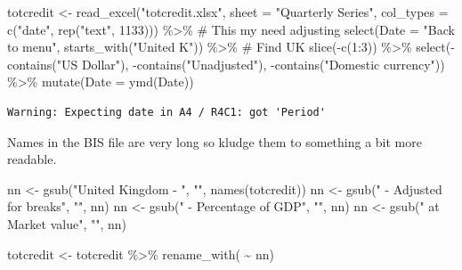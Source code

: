 \documentclass[
  letterpaper,
]{book}
\newenvironment{Shaded}{\begin{snugshade}}{\end{snugshade}}
\newcommand{\AttributeTok}[1]{\textcolor[rgb]{0.40,0.45,0.13}{#1}}
\newcommand{\CommentTok}[1]{\textcolor[rgb]{0.37,0.37,0.37}{#1}}
\newcommand{\DecValTok}[1]{\textcolor[rgb]{0.68,0.00,0.00}{#1}}
\newcommand{\FunctionTok}[1]{\textcolor[rgb]{0.28,0.35,0.67}{#1}}
\newcommand{\NormalTok}[1]{\textcolor[rgb]{0.00,0.23,0.31}{#1}}
\newcommand{\OtherTok}[1]{\textcolor[rgb]{0.00,0.23,0.31}{#1}}
\newcommand{\SpecialCharTok}[1]{\textcolor[rgb]{0.37,0.37,0.37}{#1}}
\newcommand{\StringTok}[1]{\textcolor[rgb]{0.13,0.47,0.30}{#1}}
\begin{document}
\begin{Shaded}
\begin{Highlighting}[]
\NormalTok{totcredit }\OtherTok{\textless{}{-}} \FunctionTok{read\_excel}\NormalTok{(}\StringTok{"totcredit.xlsx"}\NormalTok{, }
                        \AttributeTok{sheet =} \StringTok{"Quarterly Series"}\NormalTok{,}
                        \AttributeTok{col\_types =} \FunctionTok{c}\NormalTok{(}\StringTok{"date"}\NormalTok{, }\FunctionTok{rep}\NormalTok{(}\StringTok{"text"}\NormalTok{, }\DecValTok{1133}\NormalTok{))) }\SpecialCharTok{\%\textgreater{}\%}   \CommentTok{\# This my need adjusting}
  \FunctionTok{select}\NormalTok{(}\AttributeTok{Date =} \StringTok{"Back to menu"}\NormalTok{, }\FunctionTok{starts\_with}\NormalTok{(}\StringTok{"United K"}\NormalTok{)) }\SpecialCharTok{\%\textgreater{}\%}            \CommentTok{\# Find UK}
  \FunctionTok{slice}\NormalTok{(}\SpecialCharTok{{-}}\FunctionTok{c}\NormalTok{(}\DecValTok{1}\SpecialCharTok{:}\DecValTok{3}\NormalTok{)) }\SpecialCharTok{\%\textgreater{}\%} 
  \FunctionTok{select}\NormalTok{(}\SpecialCharTok{{-}}\FunctionTok{contains}\NormalTok{(}\StringTok{"US Dollar"}\NormalTok{), }\SpecialCharTok{{-}}\FunctionTok{contains}\NormalTok{(}\StringTok{"Unadjusted"}\NormalTok{), }\SpecialCharTok{{-}}\FunctionTok{contains}\NormalTok{(}\StringTok{"Domestic currency"}\NormalTok{)) }\SpecialCharTok{\%\textgreater{}\%}
  \FunctionTok{mutate}\NormalTok{(}\AttributeTok{Date =} \FunctionTok{ymd}\NormalTok{(Date)) }
\end{Highlighting}
\end{Shaded}

\begin{verbatim}
Warning: Expecting date in A4 / R4C1: got 'Period'
\end{verbatim}

Names in the BIS file are very long so kludge them to something a bit
more readable.

\begin{Shaded}
\begin{Highlighting}[]
\NormalTok{nn  }\OtherTok{\textless{}{-}} \FunctionTok{gsub}\NormalTok{(}\StringTok{"United Kingdom {-} "}\NormalTok{, }\StringTok{""}\NormalTok{, }\FunctionTok{names}\NormalTok{(totcredit))}
\NormalTok{nn  }\OtherTok{\textless{}{-}} \FunctionTok{gsub}\NormalTok{(}\StringTok{" {-} Adjusted for breaks"}\NormalTok{, }\StringTok{""}\NormalTok{, nn)}
\NormalTok{nn  }\OtherTok{\textless{}{-}} \FunctionTok{gsub}\NormalTok{(}\StringTok{" {-} Percentage of GDP"}\NormalTok{, }\StringTok{""}\NormalTok{, nn)}
\NormalTok{nn  }\OtherTok{\textless{}{-}} \FunctionTok{gsub}\NormalTok{(}\StringTok{" at Market value"}\NormalTok{, }\StringTok{""}\NormalTok{, nn)}

\NormalTok{totcredit }\OtherTok{\textless{}{-}}\NormalTok{ totcredit }\SpecialCharTok{\%\textgreater{}\%}
  \FunctionTok{rename\_with}\NormalTok{( }\SpecialCharTok{\textasciitilde{}}\NormalTok{ nn)}
\end{Highlighting}
\end{Shaded}
\end{document}
